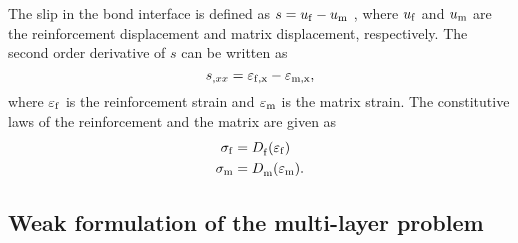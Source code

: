 \documentclass[main.tex]{subfiles}
\begin{document}
The slip in the bond interface is defined as $s = {u_{\rm{f}}} - {u_{\rm{m}}}$ , where  ${u_{\rm{f}}}$ and ${u_{\rm{m}}}$  are the reinforcement displacement and matrix displacement, respectively. The second order derivative of $s$  can be written as
\begin{equation} \label{eq:slip}
s_{,xx} = {\varepsilon _{\rm{f,x}}} - {\varepsilon _{\rm{m,x}}},
\end{equation}
where ${\varepsilon _{\rm{f}}}$  is the reinforcement strain and ${\varepsilon _{\rm{m}}}$ is the matrix strain. The constitutive laws of the reinforcement and the matrix are given as
\begin{align} \label{eq:constituitive}
{\sigma _{\rm{f}}} &= D_{\rm{f}}^{}(\varepsilon_{\rm{f}})\\
{\sigma _{\rm{m}}} &= D_{\rm{m}}^{}(\varepsilon_{\rm{m}}).
\end{align}

\subsection{Weak formulation of the multi-layer problem}
\end{document}
